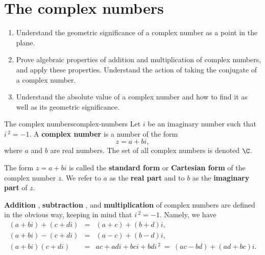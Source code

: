 \section{The complex numbers}

\begin{outcome}
  \begin{enumerate}
  \item Understand the geometric significance of a complex number as a
    point in the plane.
  \item Prove algebraic properties of addition and multiplication of
    complex numbers, and apply these properties. Understand the action
    of taking the conjugate of a complex number.
  \item Understand the absolute value of a complex number and how to
    find it as well as its geometric significance.
  \end{enumerate}
\end{outcome}

\begin{definition}{The complex numbers}{complex-numbers}
  Let $i$ be an imaginary number such that $i\,^2=-1$. A \textbf{complex
    number}%
   is a number of the form
  \begin{equation*}
    z = a + bi,
  \end{equation*}
  where $a$ and $b$ are real numbers. The set of all complex numbers
  is denoted $\C$.
\end{definition}

The form $z = a+bi$ is called the \textbf{standard form}%
%
 or \textbf{Cartesian form}%
%
 of the complex number $z$.
We refer to $a$ as the \textbf{real part}%
%
 and to $b$ as the
\textbf{imaginary part}%
%
 of $z$.

\textbf{Addition}%
%
, \textbf{subtraction}%
%
, and \textbf{multiplication}%
%
 of complex numbers are
defined in the obvious way, keeping in mind that $i\,^2=-1$. Namely, we
have
\begin{eqnarray*}
  (a+bi) + (c+di) &=& (a+c) + (b+d)i, \\
  (a+bi) - (c+di) &=& (a-c) + (b-d)i, \\
  (a+bi) (c+di)   &=& ac+adi+bci+bdi\,^2 ~=~ (ac-bd) + (ad + bc)i.
\end{eqnarray*}

